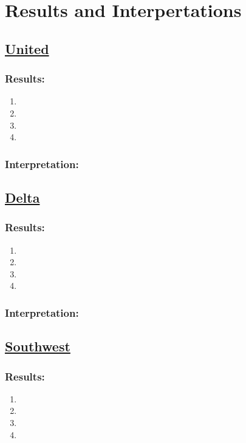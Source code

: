 \documentclass[12pt]{report}
\begin{document}
\newpage
\chapter*{Results and Interpertations}

\section*{\underline{United}}
\subsection*{Results:}
\begin{enumerate}
    \item
    \item
    \item
    \item
\end{enumerate}
\subsection*{Interpretation:}

\newpage
\section*{\underline{Delta}}
\subsection*{Results:}
\begin{enumerate}
    \item
    \item
    \item
    \item
\end{enumerate}
\subsection*{Interpretation:}

\newpage
\section*{\underline{Southwest}}
\subsection*{Results:}
\begin{enumerate}
    \item
    \item
    \item
    \item
\end{enumerate}
\end{document}
